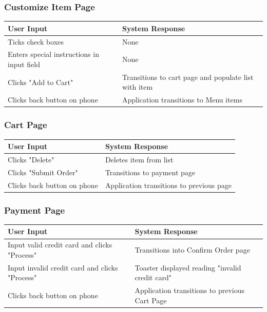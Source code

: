 \documentclass[12pt, titlepage]{article}
\begin{document}
\subsubsection{Customize Item Page}
\begin{center}
    \begin{tabular}{ | l | p{8cm} |}
    \hline
    User Input & System Response \\ \hline
    Ticks check boxes & None \\ \hline
    Enters special instructions in input field & None \\ \hline
    Clicks "Add to Cart" & Transitions to cart page and populate list with item \\ \hline
    Clicks back button on phone & Application transitions to Menu items \\
    \hline
    \end{tabular}
\end{center}

\subsubsection{Cart Page}
\begin{center}
    \begin{tabular}{ | l | p{10cm} |}
    \hline
    User Input & System Response \\ \hline
 	Clicks "Delete" &  Deletes item from list\\ \hline
    Clicks "Submit Order" &  Transitions to payment page\\ \hline
    Clicks back button on phone & Application transitions to previous page \\
    \hline
    \end{tabular}
\end{center}

\subsubsection{Payment Page}

\begin{center}
    \begin{tabular}{ | l | p{7cm} |}
    \hline
    User Input & System Response \\ \hline
 	Input valid credit card and clicks "Process" & Transitions into Confirm Order page \\ \hline
    Input invalid credit card and clicks "Process" &  Toaster displayed reading "invalid credit card"\\ \hline
    Clicks back button on phone & Application transitions to previous Cart Page \\
    \hline
    \end{tabular}
\end{center}
\end{document}
